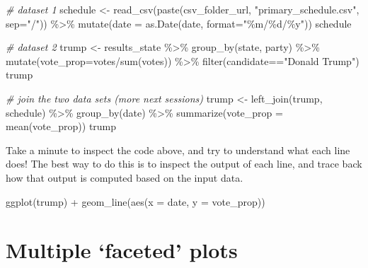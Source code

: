 \documentclass[
]{article}
\newenvironment{Shaded}{\begin{snugshade}}{\end{snugshade}}
\newcommand{\AttributeTok}[1]{\textcolor[rgb]{0.77,0.63,0.00}{#1}}
\newcommand{\CommentTok}[1]{\textcolor[rgb]{0.56,0.35,0.01}{\textit{#1}}}
\newcommand{\FunctionTok}[1]{\textcolor[rgb]{0.00,0.00,0.00}{#1}}
\newcommand{\NormalTok}[1]{#1}
\newcommand{\OtherTok}[1]{\textcolor[rgb]{0.56,0.35,0.01}{#1}}
\newcommand{\SpecialCharTok}[1]{\textcolor[rgb]{0.00,0.00,0.00}{#1}}
\newcommand{\StringTok}[1]{\textcolor[rgb]{0.31,0.60,0.02}{#1}}
\begin{document}
\begin{Shaded}
\begin{Highlighting}[]
\CommentTok{\# dataset 1}
\NormalTok{schedule  }\OtherTok{\textless{}{-}} \FunctionTok{read\_csv}\NormalTok{(}\FunctionTok{paste}\NormalTok{(csv\_folder\_url, }\StringTok{"primary\_schedule.csv"}\NormalTok{, }\AttributeTok{sep=}\StringTok{"/"}\NormalTok{)) }\SpecialCharTok{\%\textgreater{}\%} 
  \FunctionTok{mutate}\NormalTok{(}\AttributeTok{date =} \FunctionTok{as.Date}\NormalTok{(date, }\AttributeTok{format=}\StringTok{"\%m/\%d/\%y"}\NormalTok{))}
\NormalTok{schedule}

\CommentTok{\# dataset 2}
\NormalTok{trump }\OtherTok{\textless{}{-}}\NormalTok{ results\_state }\SpecialCharTok{\%\textgreater{}\%} 
  \FunctionTok{group\_by}\NormalTok{(state, party) }\SpecialCharTok{\%\textgreater{}\%} 
  \FunctionTok{mutate}\NormalTok{(}\AttributeTok{vote\_prop=}\NormalTok{votes}\SpecialCharTok{/}\FunctionTok{sum}\NormalTok{(votes)) }\SpecialCharTok{\%\textgreater{}\%} 
  \FunctionTok{filter}\NormalTok{(candidate}\SpecialCharTok{==}\StringTok{"Donald Trump"}\NormalTok{)}
\NormalTok{trump}

\CommentTok{\# join the two data sets (more next sessions)}
\NormalTok{trump }\OtherTok{\textless{}{-}} \FunctionTok{left\_join}\NormalTok{(trump, schedule) }\SpecialCharTok{\%\textgreater{}\%} 
  \FunctionTok{group\_by}\NormalTok{(date) }\SpecialCharTok{\%\textgreater{}\%} 
  \FunctionTok{summarize}\NormalTok{(}\AttributeTok{vote\_prop =} \FunctionTok{mean}\NormalTok{(vote\_prop))}
\NormalTok{trump}
\end{Highlighting}
\end{Shaded}

Take a minute to inspect the code above, and try to understand what each
line does! The best way to do this is to inspect the output of each
line, and trace back how that output is computed based on the input
data.

\begin{Shaded}
\begin{Highlighting}[]
\FunctionTok{ggplot}\NormalTok{(trump) }\SpecialCharTok{+} 
  \FunctionTok{geom\_line}\NormalTok{(}\FunctionTok{aes}\NormalTok{(}\AttributeTok{x =}\NormalTok{ date, }\AttributeTok{y =}\NormalTok{ vote\_prop))}
\end{Highlighting}
\end{Shaded}

\hypertarget{multiple-faceted-plots}{%
\section{Multiple `faceted' plots}\label{multiple-faceted-plots}}
\end{document}
